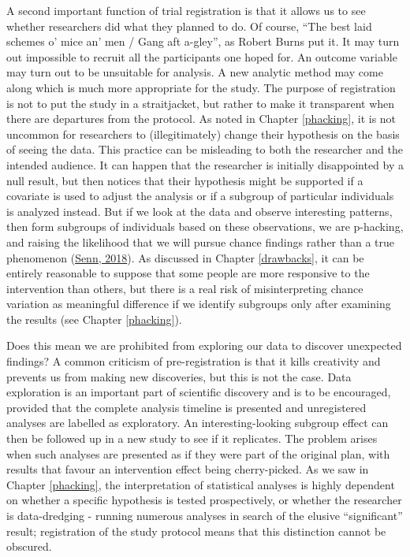 \documentclass{krantz}
\begin{document}
A second important function of trial registration is that it allows us to see whether researchers did what they planned to do. Of course, ``The best laid schemes o' mice an' men / Gang aft a-gley'', as Robert Burns put it. It may turn out impossible to recruit all the participants one hoped for. An outcome variable may turn out to be unsuitable for analysis. A new analytic method may come along which is much more appropriate for the study. The purpose of registration is not to put the study in a straitjacket, but rather to make it transparent when there are departures from the protocol. As noted in Chapter \ref{phacking}, it is not uncommon for researchers to (illegitimately) change their hypothesis on the basis of seeing the data. This practice can be misleading to both the researcher and the intended audience. It can happen that the researcher is initially disappointed by a null result, but then notices that their hypothesis might be supported if a covariate is used to adjust the analysis or if a subgroup of particular individuals is analyzed instead. But if we look at the data and observe interesting patterns, then form subgroups of individuals based on these observations, we are p-hacking, and raising the likelihood that we will pursue chance findings rather than a true phenomenon (\protect\hyperlink{ref-senn2018}{Senn, 2018}). As discussed in Chapter \ref{drawbacks}, it can be entirely reasonable to suppose that some people are more responsive to the intervention than others, but there is a real risk of misinterpreting chance variation as meaningful difference if we identify subgroups only after examining the results (see Chapter \ref{phacking}).

Does this mean we are prohibited from exploring our data to discover unexpected findings? A common criticism of pre-registration is that it kills creativity and prevents us from making new discoveries, but this is not the case. Data exploration is an important part of scientific discovery and is to be encouraged, provided that the complete analysis timeline is presented and unregistered analyses are labelled as exploratory. An interesting-looking subgroup effect can then be followed up in a new study to see if it replicates. The problem arises when such analyses are presented as if they were part of the original plan, with results that favour an intervention effect being cherry-picked. As we saw in Chapter \ref{phacking}, the interpretation of statistical analyses is highly dependent on whether a specific hypothesis is tested prospectively, or whether the researcher is data-dredging - running numerous analyses in search of the elusive ``significant'' result; registration of the study protocol means that this distinction cannot be obscured.
\end{document}
